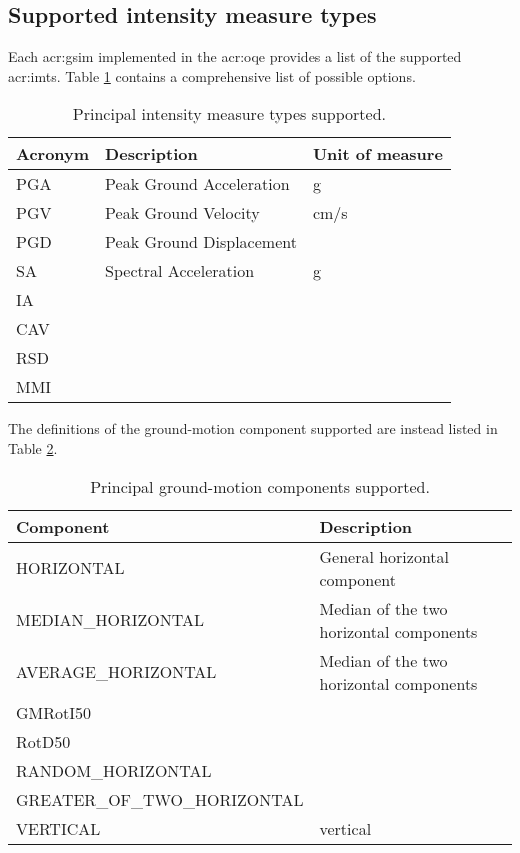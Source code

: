 \subsection{Supported intensity measure types}
Each \gls{acr:gsim} implemented in the \gls{acr:oqe} provides a list of the 
supported \glspl{acr:imt}. Table \ref{tab:imts} contains a comprehensive list 
of possible options.
\begin{table}[!h]
\centering
\begin{tabular}{|p{3cm}p{5cm}p{3cm}|}
\hline
\rowcolor{anti-flashwhite}
\bf{Acronym} & \bf{Description} & \bf{Unit of measure} \\
\hline 
PGA & Peak Ground Acceleration & g \\
PGV & Peak Ground Velocity     & cm/s \\
PGD & Peak Ground Displacement & \\
SA  & Spectral Acceleration    & g \\
IA  &  &  \\
CAV &  &  \\
RSD &  &  \\
MMI &  &  \\
\hline
\end{tabular}
\caption{Principal intensity measure types supported.}
\label{tab:imts}
\end{table}

The definitions of the ground-motion component supported are instead listed in
Table \ref{tab:hor_comp}. 
\begin{table}[!h]
\centering
\begin{tabular}{|p{6cm}p{7cm}|}
\hline
\rowcolor{anti-flashwhite}
\bf{Component} & \bf{Description} \\
\hline 
HORIZONTAL & General horizontal component \\
MEDIAN\_HORIZONTAL & Median of the two horizontal components \\
AVERAGE\_HORIZONTAL & Median of the two horizontal components \\
GMRotI50 & \parencite{boore2010} \\
RotD50 &  \\
RANDOM\_HORIZONTAL &  \\
GREATER\_OF\_TWO\_HORIZONTAL &  \\
VERTICAL & vertical \\
\hline
\end{tabular}
\caption{Principal ground-motion components supported.}
\label{tab:hor_comp} 
\end{table}
